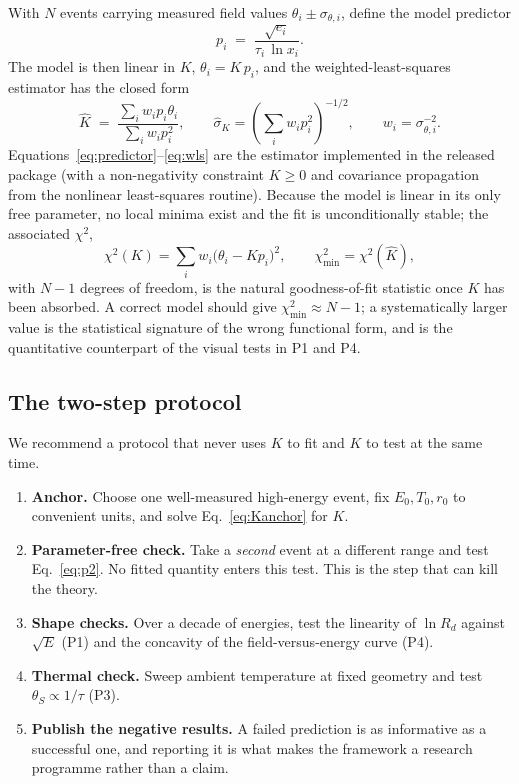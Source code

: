 \documentclass[11pt,a4paper]{article}
\newcommand{\thetaS}{\theta_{S}}
\newcommand{\tgrad}{\tau}
\begin{document}
With $N$ events carrying measured field values
$\theta_i \pm \sigma_{\theta,i}$, define the model predictor
\begin{equation}
  p_i \;=\; \frac{\sqrt{e_i}}{\tgrad_i\,\ln x_i} .
  \label{eq:predictor}
\end{equation}
The model is then linear in $K$, $\theta_i = K\,p_i$, and the
weighted-least-squares estimator has the closed form
\begin{equation}
  \widehat{K} \;=\; \frac{\sum_i w_i p_i\theta_i}{\sum_i w_i p_i^{2}} ,
  \qquad
  \widehat{\sigma}_K = \left(\sum_i w_i p_i^{2}\right)^{-1/2},
  \qquad w_i = \sigma_{\theta,i}^{-2} .
  \label{eq:wls}
\end{equation}
Equations~\eqref{eq:predictor}--\eqref{eq:wls} are the estimator implemented
in the released package (with a non-negativity constraint $K\ge0$ and
covariance propagation from the nonlinear least-squares routine). Because the
model is linear in its only free parameter, no local minima exist and the fit
is unconditionally stable; the associated $\chi^{2}$,
\begin{equation}
  \chi^{2}(K) = \sum_i w_i\bigl(\theta_i - Kp_i\bigr)^{2},
  \qquad \chi^{2}_{\min} = \chi^{2}(\widehat{K}),
\end{equation}
with $N-1$ degrees of freedom, is the natural goodness-of-fit statistic once
$K$ has been absorbed. A correct model should give
$\chi^{2}_{\min}\approx N-1$; a systematically larger value is the
statistical signature of the wrong functional form, and is the quantitative
counterpart of the visual tests in P1 and P4.

\subsection{The two-step protocol}

We recommend a protocol that never uses $K$ to fit and $K$ to test at the same
time.
\begin{enumerate}
  \item \textbf{Anchor.} Choose one well-measured high-energy event, fix
        $E_0,T_0,r_0$ to convenient units, and solve Eq.~\eqref{eq:Kanchor}
        for $K$.
  \item \textbf{Parameter-free check.} Take a \emph{second} event at a
        different range and test Eq.~\eqref{eq:p2}. No fitted quantity enters
        this test. This is the step that can kill the theory.
  \item \textbf{Shape checks.} Over a decade of energies, test the linearity
        of $\ln R_d$ against $\sqrt{E}$ (P1) and the concavity of the
        field-versus-energy curve (P4).
  \item \textbf{Thermal check.} Sweep ambient temperature at fixed geometry
        and test $\thetaS\propto1/\tgrad$ (P3).
  \item \textbf{Publish the negative results.} A failed prediction is as
        informative as a successful one, and reporting it is what makes the
        framework a research programme rather than a claim.
\end{enumerate}
\end{document}
